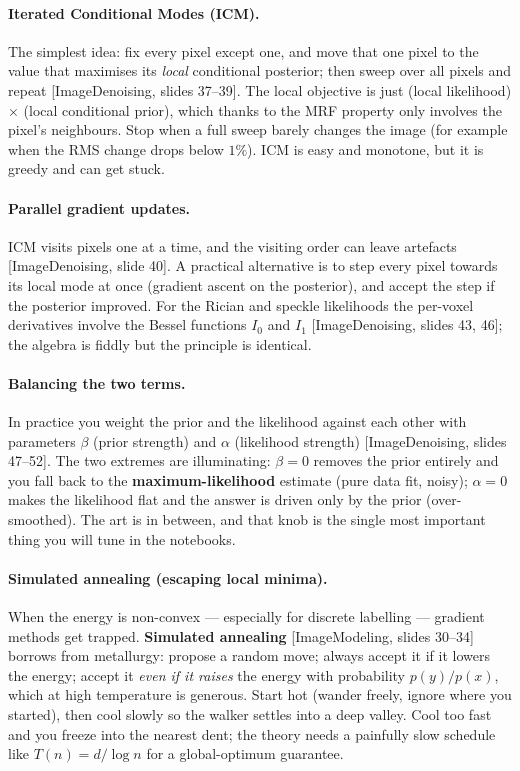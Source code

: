 \documentclass[11pt]{article}
\newcommand{\deck}[1]{\textsf{\small[#1]}}
\begin{document}
\paragraph{Iterated Conditional Modes (ICM).} The simplest idea: fix every
pixel except one, and move that one pixel to the value that maximises its
\emph{local} conditional posterior; then sweep over all pixels and repeat
\deck{ImageDenoising, slides 37--39}. The local objective is just
(local likelihood) $\times$ (local conditional prior), which thanks to the MRF
property only involves the pixel's neighbours. Stop when a full sweep barely
changes the image (for example when the RMS change drops below $1\%$). ICM is
easy and monotone, but it is greedy and can get stuck.

\paragraph{Parallel gradient updates.} ICM visits pixels one at a time, and the
visiting order can leave artefacts \deck{ImageDenoising, slide 40}. A practical
alternative is to step every pixel towards its local mode at once (gradient
ascent on the posterior), and accept the step if the posterior improved. For
the Rician and speckle likelihoods the per-voxel derivatives involve the Bessel
functions $I_0$ and $I_1$ \deck{ImageDenoising, slides 43, 46}; the algebra is
fiddly but the principle is identical.

\paragraph{Balancing the two terms.} In practice you weight the prior and the
likelihood against each other with parameters $\beta$ (prior strength) and
$\alpha$ (likelihood strength) \deck{ImageDenoising, slides 47--52}. The two
extremes are illuminating: $\beta=0$ removes the prior entirely and you fall
back to the \textbf{maximum-likelihood} estimate (pure data fit, noisy);
$\alpha=0$ makes the likelihood flat and the answer is driven only by the prior
(over-smoothed). The art is in between, and that knob is the single most
important thing you will tune in the notebooks.

\paragraph{Simulated annealing (escaping local minima).} When the energy is
non-convex --- especially for discrete labelling --- gradient methods get
trapped. \textbf{Simulated annealing} \deck{ImageModeling, slides 30--34}
borrows from metallurgy: propose a random move; always accept it if it lowers
the energy; accept it \emph{even if it raises} the energy with probability
$p(y)/p(x)$, which at high temperature is generous. Start hot (wander freely,
ignore where you started), then cool slowly so the walker settles into a deep
valley. Cool too fast and you freeze into the nearest dent; the theory needs a
painfully slow schedule like $T(n)=d/\log n$ for a global-optimum guarantee.
\end{document}
